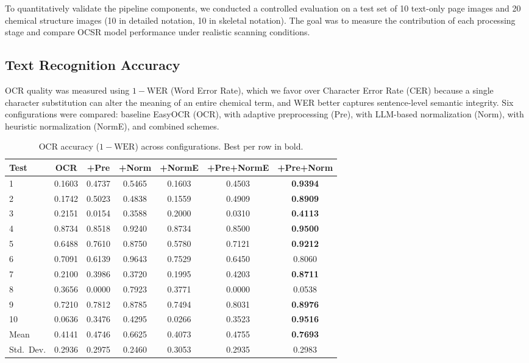 \documentclass[conference]{IEEEtran}
\begin{document}
To quantitatively validate the pipeline components, we conducted a controlled evaluation on a test set of 10 text-only page images and 20 chemical structure images (10 in detailed notation, 10 in skeletal notation). The goal was to measure the contribution of each processing stage and compare OCSR model performance under realistic scanning conditions.

\subsection{Text Recognition Accuracy}

OCR quality was measured using $1 - \text{WER}$ (Word Error Rate), which we favor over Character Error Rate (CER) because a single character substitution can alter the meaning of an entire chemical term, and WER better captures sentence-level semantic integrity. Six configurations were compared: baseline EasyOCR (OCR), with adaptive preprocessing (Pre), with LLM-based normalization (Norm), with heuristic normalization (NormE), and combined schemes.

\begin{table}[t]
\centering
\small
\caption{OCR accuracy ($1 - \text{WER}$) across configurations. Best per row in bold.}
\label{tab:ocr}
\begin{tabular}{lcccccc}
\toprule
Test & OCR & +Pre & +Norm & +NormE & +Pre+NormE & \textbf{+Pre+Norm} \\
\midrule
1 & 0.1603 & 0.4737 & 0.5465 & 0.1603 & 0.4503 & \textbf{0.9394} \\
2 & 0.1742 & 0.5023 & 0.4838 & 0.1559 & 0.4909 & \textbf{0.8909} \\
3 & 0.2151 & 0.0154 & 0.3588 & 0.2000 & 0.0310 & \textbf{0.4113} \\
4 & 0.8734 & 0.8518 & 0.9240 & 0.8734 & 0.8500 & \textbf{0.9500} \\
5 & 0.6488 & 0.7610 & 0.8750 & 0.5780 & 0.7121 & \textbf{0.9212} \\
6 & 0.7091 & 0.6139 & 0.9643 & 0.7529 & 0.6450 & 0.8060 \\
7 & 0.2100 & 0.3986 & 0.3720 & 0.1995 & 0.4203 & \textbf{0.8711} \\
8 & 0.3656 & 0.0000 & 0.7923 & 0.3771 & 0.0000 & 0.0538 \\
9 & 0.7210 & 0.7812 & 0.8785 & 0.7494 & 0.8031 & \textbf{0.8976} \\
10 & 0.0636 & 0.3476 & 0.4295 & 0.0266 & 0.3523 & \textbf{0.9516} \\
\midrule
Mean & 0.4141 & 0.4746 & 0.6625 & 0.4073 & 0.4755 & \textbf{0.7693} \\
Std.~Dev. & 0.2936 & 0.2975 & 0.2460 & 0.3053 & 0.2935 & 0.2983 \\
\bottomrule
\end{tabular}
\end{table}
\end{document}
